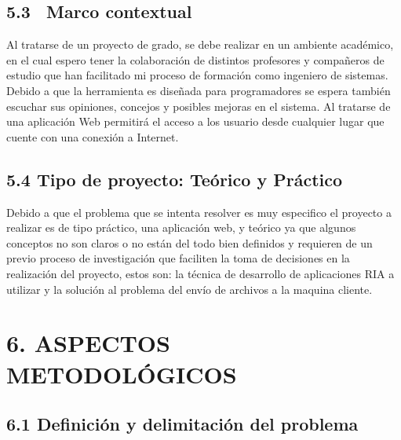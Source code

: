 \documentclass[12pt,letterpaper,oneside]{article}
\begin{document}
\bigskip


\bigskip


\bigskip

\subsection{5.3 \ Marco contextual}

\bigskip

Al tratarse de un proyecto de grado, se debe realizar en un ambiente
académico, en el cual espero tener la colaboración de distintos
profesores y compañeros de estudio que han facilitado mi proceso de
formación como ingeniero de sistemas. Debido a que la herramienta es
diseñada para programadores se espera también escuchar sus
opiniones, concejos y posibles mejoras en el sistema. Al tratarse de
una aplicación Web permitirá el acceso a los usuario desde
cualquier lugar que cuente con una conexión a Internet.


\bigskip

\subsection{5.4 Tipo de proyecto: Teórico y Práctico}

\bigskip

Debido a que el problema que se intenta resolver es muy especifico el
proyecto a realizar es de tipo práctico, una aplicación web, y
teórico ya que algunos conceptos no son claros o no están del todo
bien definidos y requieren de un previo proceso de investigación que
faciliten la toma de decisiones en la realización del proyecto, estos
son: la técnica de desarrollo de aplicaciones RIA a utilizar y la
solución al problema del envío de archivos a la maquina cliente.


\bigskip


\bigskip


\bigskip


\bigskip


\bigskip


\bigskip

\section{6. ASPECTOS METODOL\'OGICOS}

\bigskip

\subsection{6.1 Definición y delimitación del problema}
\end{document}

